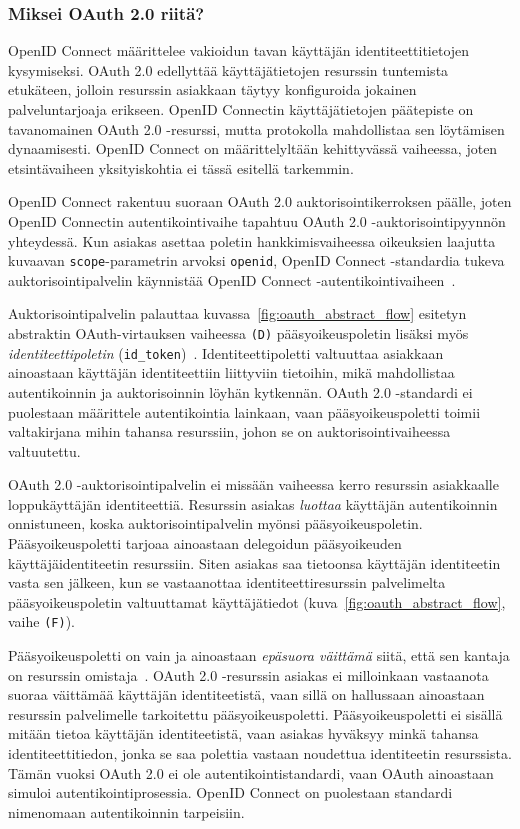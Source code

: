 \documentclass[finnish,gradu]{tktltiki}
\begin{document}
  \subsubsection{Miksei OAuth 2.0 riitä?} %
  \label{ssub:virtaukset}

  OpenID Connect määrittelee vakioidun tavan käyttäjän identiteettitietojen kysymiseksi. OAuth 2.0 edellyttää käyttäjätietojen resurssin tuntemista etukäteen, jolloin resurssin asiakkaan täytyy konfiguroida jokainen palveluntarjoaja erikseen. OpenID Connectin käyttäjätietojen päätepiste on tavanomainen OAuth 2.0 -resurssi, mutta protokolla mahdollistaa sen löytämisen dynaamisesti. OpenID Connect on määrittelyltään kehittyvässä vaiheessa, joten etsintävaiheen yksityiskohtia ei tässä esitellä tarkemmin.

  OpenID Connect rakentuu suoraan OAuth 2.0 auktorisointikerroksen päälle, joten OpenID Connectin autentikointivaihe tapahtuu OAuth 2.0 -auktorisointipyynnön yhteydessä. Kun asiakas asettaa poletin hankkimisvaiheessa oikeuksien laajutta kuvaavan \verb!scope!-parametrin arvoksi \verb!openid!, OpenID Connect -standardia tukeva auktorisointipalvelin käynnistää OpenID Connect -autentikointivaiheen~\cite{sakimura_openid_c_nutshell_2012}.

  Auktorisointipalvelin palauttaa kuvassa~\ref{fig:oauth_abstract_flow} esitetyn abstraktin OAuth-virtauksen vaiheessa \verb!(D)! pääsyoikeuspoletin lisäksi myös \emph{identiteettipoletin} (\verb!id_token!)~\cite{bradley_openid_c_id_token_2012}. Identiteettipoletti valtuuttaa asiakkaan ainoastaan käyttäjän identiteettiin liittyviin tietoihin, mikä mahdollistaa autentikoinnin ja auktorisoinnin löyhän kytkennän. OAuth 2.0 -standardi ei puolestaan määrittele autentikointia lainkaan, vaan pääsyoikeuspoletti toimii valtakirjana mihin tahansa resurssiin, johon se on auktorisointivaiheessa valtuutettu.

  OAuth 2.0 -auktorisointipalvelin ei missään vaiheessa kerro resurssin asiakkaalle loppukäyttäjän identiteettiä. Resurssin asiakas \emph{luottaa} käyttäjän autentikoinnin onnistuneen, koska auktorisointipalvelin myönsi pääsyoikeuspoletin. Pääsyoikeuspoletti tarjoaa ainoastaan delegoidun pääsyoikeuden käyttäjäidentiteetin resurssiin. Siten asiakas saa tietoonsa käyttäjän identiteetin vasta sen jälkeen, kun se vastaanottaa identiteettiresurssin palvelimelta pääsyoikeuspoletin valtuuttamat käyttäjätiedot (kuva~\ref{fig:oauth_abstract_flow}, vaihe \verb!(F)!).

  Pääsyoikeuspoletti on vain ja ainoastaan \emph{epäsuora väittämä} siitä, että sen kantaja on resurssin omistaja~\cite{bradley_oauth_authentication_problem_2012}. OAuth 2.0 -resurssin asiakas ei milloinkaan vastaanota suoraa väittämää käyttäjän identiteetistä, vaan sillä on hallussaan ainoastaan resurssin palvelimelle tarkoitettu pääsyoikeuspoletti. Pääsyoikeuspoletti ei sisällä mitään tietoa käyttäjän identiteetistä, vaan asiakas hyväksyy minkä tahansa identiteettitiedon, jonka se saa polettia vastaan noudettua identiteetin resurssista. Tämän vuoksi OAuth 2.0 ei ole autentikointistandardi, vaan OAuth ainoastaan simuloi autentikointiprosessia. OpenID Connect on puolestaan standardi nimenomaan autentikoinnin tarpeisiin.
\end{document}
